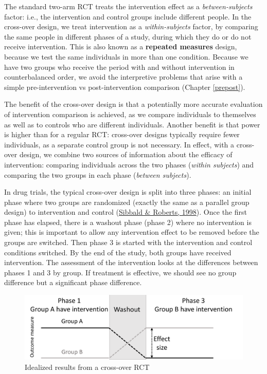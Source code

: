 \documentclass{krantz}
\begin{document}
The standard two-arm RCT treats the intervention effect as a \emph{between-subjects} factor: i.e., the intervention and control groups include different people. In the cross-over design, we treat intervention as a \emph{within-subjects} factor, by comparing the same people in different phases of a study, during which they do or do not receive intervention. This is also known as a \textbf{repeated measures} design, because we test the same individuals in more than one condition. Because we have two groups who receive the period with and without intervention in counterbalanced order, we avoid the interpretive problems that arise with a simple pre-intervention vs post-intervention comparison (Chapter \ref{prepost}).

The benefit of the cross-over design is that a potentially more accurate evaluation of intervention comparison is achieved, as we compare individuals to themselves as well as to controls who are different individuals. Another benefit is that power is higher than for a regular RCT: cross-over designs typically require fewer individuals, as a separate control group is not necessary. In effect, with a cross-over design, we combine two sources of information about the efficacy of intervention: comparing individuals across the two phases (\emph{within subjects}) and comparing the two groups in each phase (\emph{between subjects}).

In drug trials, the typical cross-over design is split into three phases: an initial phase where two groups are randomized (exactly the same as a parallel group design) to intervention and control (\protect\hyperlink{ref-sibbald1998}{Sibbald \& Roberts, 1998}). Once the first phase has elapsed, there is a washout phase (phase 2) where no intervention is given; this is important to allow any intervention effect to be removed before the groups are switched. Then phase 3 is started with the intervention and control conditions switched. By the end of the study, both groups have received intervention. The assessment of the intervention looks at the differences between phases 1 and 3 by group. If treatment is effective, we should see no group difference but a significant phase difference.

\begin{figure}
\includegraphics[width=0.8\linewidth]{images_bw/crossover} \caption{Idealized results from a cross-over RCT}\label{fig:crossoverplot}
\end{figure}
\end{document}
